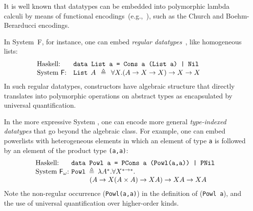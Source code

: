 It is well known that datatypes can be embedded into polymorphic lambda
calculi by means of functional encodings~(e.g.,~\cite{AbeMatUus03}), such
as the Church and Boehm-Berarducci encodings.

In System~\textsf{F}, for instance, one can embed \emph{regular
datatypes}~\cite{BoehmBerarducci}, like homogeneous lists:
\[\!\!\!\!\!\!\!\!\!
\begin{array}{ll}
\text{Haskell:} & \texttt{data List a = Cons a (List a) | Nil} \\
\text{System \textsf{F}:} & 
\texttt{{List}}\:\: A\:\:\triangleq\:\:
\forall X.
(A\to X\to X) \to X \to X ~~\; 
\end{array}
\]
In such regular datatypes, constructors have algebraic structure that
directly translates into polymorphic operations on abstract types as
encapsulated by universal quantification.

In the more expressive System \Fw, one can encode more general
\emph{type-indexed datatypes} that go beyond the algebraic class.
For example, one can embed powerlists with
heterogeneous elements in which an element of type \texttt{a} is followed by
an element of the product type \texttt{(a,a)}:
\[
\begin{array}{ll}
\text{Haskell:} & \!\!\!\!\texttt{data Powl a = 
	PCons a (Powl(a,a))
	| 
	PNil 
} \\
\text{System \Fw:} & \!\!\!\!\texttt{{Powl}}\:\triangleq\:
\lambda A^{*}.\forall X^{*\to*}.\\ \qquad
& \qquad 
(A\to X(A\times A)\to X A)
\to 
X A
\to XA
\end{array}
\]
Note the non-regular occurrence (\texttt{Powl(a,a)}) in the definition of
(\texttt{Powl a}), and the use of universal quantification over
higher-order kinds.


